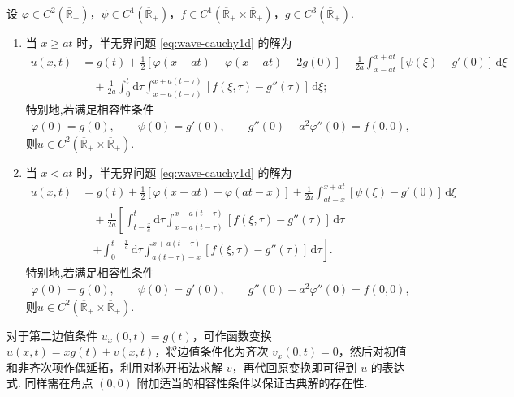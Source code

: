 \documentclass[../../main.tex]{subfiles}%
\begin{document}
\begin{theorem}[一维半无界波动方程非齐次边值情形的解]\label{theorem:一维半无界波动方程非齐次边值情形的解}
设 $\varphi\in C^2(\overline{\mathbb{R}}_+)$，$\psi\in C^1(\overline{\mathbb{R}}_+)$，$f\in C^1(\overline{\mathbb{R}}_+\times\overline{\mathbb{R}}_+)$，$g\in C^3(\overline{\mathbb{R}}_+)$.
\begin{enumerate}[(1)]
\item 当 $x\geqslant at$ 时，半无界问题 \eqref{eq:wave-cauchy1d} 的解为
\begin{align}
u(x,t)&=g(t)+\frac{1}{2}[\varphi(x+at)+\varphi(x-at)-2g(0)]+\frac{1}{2a}\int_{x-at}^{x+at}[\psi(\xi)-g'(0)]\,\mathrm{d}\xi \nonumber \\
&\quad+\frac{1}{2a}\int_0^t\mathrm{d}\tau\int_{x-a(t-\tau)}^{x+a(t-\tau)}[f(\xi,\tau)-g''(\tau)]\,\mathrm{d}\xi;\label{eq:nonzero-sol1}
\end{align}
特别地,若满足相容性条件
\begin{align*}
\varphi(0)=g(0),\qquad \psi(0)=g'(0),\qquad g''(0)-a^2\varphi''(0)=f(0,0),
\end{align*}
则$u\in C^2(\overline{\mathbb{R}}_+\times\overline{\mathbb{R}}_+)$.

\item 当 $x<at$ 时，半无界问题 \eqref{eq:wave-cauchy1d} 的解为
\begin{align}
u(x,t)&=g(t)+\frac{1}{2}[\varphi(x+at)-\varphi(at-x)]+\frac{1}{2a}\int_{at-x}^{x+at}[\psi(\xi)-g'(0)]\,\mathrm{d}\xi \nonumber \\
&\quad+\frac{1}{2a}\left[\int_{t-\frac{x}{a}}^t\mathrm{d}\tau\int_{x-a(t-\tau)}^{x+a(t-\tau)}[f(\xi,\tau)-g''(\tau)]\,\mathrm{d}\tau\right. \nonumber \\
&\quad\left.+\int_0^{t-\frac{x}{a}}\mathrm{d}\tau\int_{a(t-\tau)-x}^{x+a(t-\tau)}[f(\xi,\tau)-g''(\tau)]\,\mathrm{d}\tau\right].\label{eq:nonzero-sol2}
\end{align}
特别地,若满足相容性条件
\begin{align*}
\varphi(0)=g(0),\qquad \psi(0)=g'(0),\qquad g''(0)-a^2\varphi''(0)=f(0,0),
\end{align*}
则$u\in C^2(\overline{\mathbb{R}}_+\times\overline{\mathbb{R}}_+)$.
\end{enumerate}
\end{theorem}
\begin{remark}
对于第二边值条件 $u_x(0,t)=g(t)$，可作函数变换 $u(x,t)=xg(t)+v(x,t)$，将边值条件化为齐次 $v_x(0,t)=0$，然后对初值和非齐次项作偶延拓，利用对称开拓法求解 $v$，再代回原变换即可得到 $u$ 的表达式. 同样需在角点 $(0,0)$ 附加适当的相容性条件以保证古典解的存在性.
\end{remark}
\end{document}
